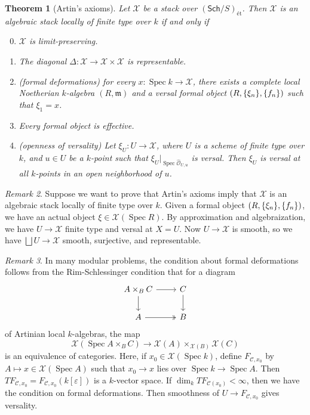 \documentclass[leqno, openany]{memoir}
\newtheorem{thm}{Theorem}[section]
\theoremstyle{definition}
\theoremstyle{remark}
\newtheorem{rmk}[thm]{Remark}
\theoremstyle{plain}
\theoremstyle{definition}
\theoremstyle{remark}
\newcommand{\ep}{\varepsilon}
\newcommand{\mc}[1]{\mathcal{#1}}
\newcommand{\mf}[1]{\mathfrak{#1}}
\newcommand{\ms}[1]{\mathsf{#1}}
\newcommand{\wh}[1]{\widehat{#1}}
\DeclareMathOperator{\Spec}{Spec}
\begin{document}
\begin{thm}[Artin's axioms]
    Let $\mc{X}$ be a stack over $(\ms{Sch}/S)_{\text{\'et}}$. Then $\mc{X}$ is an algebraic stack locally of finite type over $k$ if and only if
    \begin{enumerate}\setcounter{enumi}{-1}
        \item $\mc{X}$ is limit-preserving.
        \item The diagonal $\Delta \colon \mc{X} \to \mc{X} \times \mc{X}$ is representable.
        \item (formal deformations) for every $x \colon \Spec k \to \mc{X}$, there exists a complete local Noetherian $k$-algebra $(R, \mf{m})$ and a versal formal object $(R, \qty{\xi_n}, \qty{f_n})$ such that $\xi_1 = x$.
        \item Every formal object is effective.
        \item (openness of versality) Let $\xi_U \colon U \to \mc{X}$, where $U$ is a scheme of finite type over $k$, and $u \in U$ be a $k$-point such that $\xi_U |_{\Spec \wh{\mc{O}}_{U, u}}$ is versal. Then $\xi_U$ is versal at all $k$-points in an open neighborhood of $u$.
    \end{enumerate}
\end{thm}

\begin{rmk}
    Suppose we want to prove that Artin's axioms imply that $\mc{X}$ is an algebraic stack locally of finite type over $k$. Given a formal object $(R, \qty{\xi_n}, \qty{f_n})$, we have an actual object $\xi \in \mc{X}(\Spec R)$. By approximation and algebraization, we have $U \to \mc{X}$ finite type and versal at $X = U$. Now $U \to \mc{X}$ is smooth, so we have $\bigsqcup U \to \mc{X}$ smooth, surjective, and representable.
\end{rmk}

\begin{rmk}
    In many modular problems, the condition about formal deformations follows from the Rim-Schlessinger condition that for a diagram
    \begin{equation*}
    \begin{tikzcd}
        A \times_B C \ar{r} \ar{d} & C \ar{d} \\
        A \ar[twoheadrightarrow]{r} & B
    \end{tikzcd}
    \end{equation*}
    of Artinian local $k$-algebras, the map
    \[ \mc{X}(\Spec A \times_B C) \to \mc{X}(A) \times_{\mc{X}(B)} \mc{X}(C) \]
    is an equivalence of categories. Here, if $x_0 \in \mc{X}(\Spec k)$, define $F_{\mc{C}, x_0}$ by $A \mapsto x \in \mc{X}(\Spec A)$ such that $x_0 \to x$ lies over $\Spec k \to \Spec A$. Then $TF_{\mc{C}, x_0} = F_{\mc{C}, x_0}(k[\ep])$ is a $k$-vector space. If $\dim_k TF_{\mc{C}(x_0)} < \infty$, then we have the condition on formal deformations. Then smoothness of $U \to F_{\mc{C}, x_0}$ gives versality.
\end{rmk}
\end{document}
